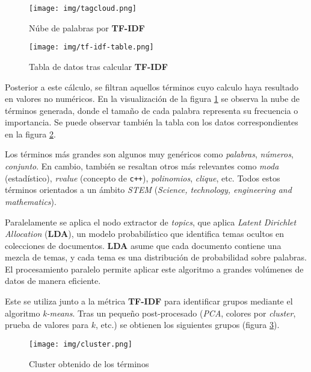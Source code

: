 \documentclass[12pt,letterpaper]{article}
\begin{document}
\begin{figure}[htp]
    \centering
    \texttt{[image: img/tagcloud.png]}
    \caption{Núbe de palabras por \textbf{TF-IDF}}
    \label{fig:tag_cloud}
\end{figure}

\begin{figure}[htp]
    \centering
    \texttt{[image: img/tf-idf-table.png]}
    \caption{Tabla de datos tras calcular \textbf{TF-IDF}}
    \label{fig:tf-idf-table}
\end{figure}

Posterior a este cálculo, se filtran aquellos términos cuyo calculo haya resultado en valores no numéricos. En la visualización de la figura \ref{fig:tag_cloud} se observa la nube de términos generada, donde el tamaño de cada palabra representa su frecuencia o importancia. Se puede observar también la tabla con los datos correspondientes en la figura \ref{fig:tf-idf-table}.

Los términos más grandes son algunos muy genéricos como \textit{palabras}, \textit{números}, \textit{conjunto}. En cambio, también se resaltan otros más relevantes como \textit{moda} (estadístico), \textit{rvalue} (concepto de \texttt{c++}), \textit{polinomios}, \textit{clique}, etc. Todos estos términos orientados a un ámbito \textit{STEM} (\textit{Science, technology, engineering and mathematics}).

Paralelamente se aplica el nodo extractor de \textit{topics}, que aplica \textit{Latent Dirichlet Allocation} (\textbf{LDA}), un modelo probabilístico que identifica temas ocultos en colecciones de documentos. \textbf{LDA} asume que cada documento contiene una mezcla de temas, y cada tema es una distribución de probabilidad sobre palabras. El procesamiento paralelo permite aplicar este algoritmo a grandes volúmenes de datos de manera eficiente.

Este se utiliza junto a la métrica \textbf{TF-IDF} para identificar grupos mediante el algoritmo \textit{k-means}. Tras un pequeño post-procesado (\textit{PCA}, colores por \textit{cluster}, prueba de valores para $k$, etc.) se obtienen los siguientes grupos (figura \ref{fig:clusters}).

\begin{figure}[htp]
    \centering
    \texttt{[image: img/cluster.png]}
    \caption{Cluster obtenido de los términos}
    \label{fig:clusters}
\end{figure}
\end{document}
